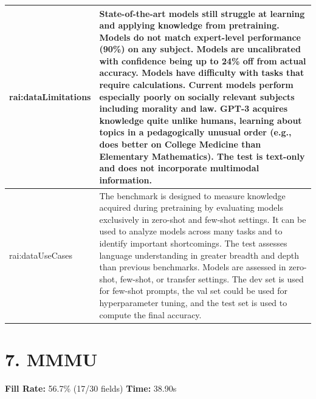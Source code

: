 \documentclass[10pt,a4paper]{article}
\begin{document}
\begin{longtable}{|p{4cm}|p{12cm}|}
\hline
rai:dataLimitations & State-of-the-art models still struggle at learning and applying knowledge from pretraining. Models do not match expert-level performance (90\%) on any subject. Models are uncalibrated with confidence being up to 24\% off from actual accuracy. Models have difficulty with tasks that require calculations. Current models perform especially poorly on socially relevant subjects including morality and law. GPT-3 acquires knowledge quite unlike humans, learning about topics in a pedagogically unusual order (e.g., does better on College Medicine than Elementary Mathematics). The test is text-only and does not incorporate multimodal information. \\
\hline
rai:dataUseCases & The benchmark is designed to measure knowledge acquired during pretraining by evaluating models exclusively in zero-shot and few-shot settings. It can be used to analyze models across many tasks and to identify important shortcomings. The test assesses language understanding in greater breadth and depth than previous benchmarks. Models are assessed in zero-shot, few-shot, or transfer settings. The dev set is used for few-shot prompts, the val set could be used for hyperparameter tuning, and the test set is used to compute the final accuracy. \\
\hline
\end{longtable}

\newpage

\section*{7. MMMU}
\textbf{Fill Rate:} 56.7\% (17/30 fields) \quad \textbf{Time:} 38.90s
\end{document}
